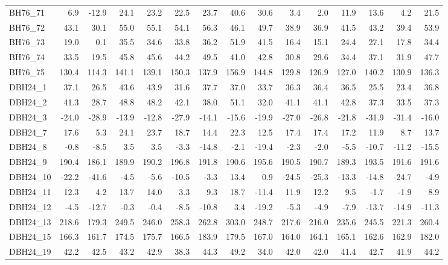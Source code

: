 \begin{longtable}{lrrrrrrrrrrrrrr}
BH76\_71 & 6.9 & -12.9 & 24.1 & 23.2 & 22.5 & 23.7 & 40.6 & 30.6 & 3.4 & 2.0 & 11.9 & 13.6 & 4.2 & 21.5 \\
BH76\_72 & 43.1 & 30.1 & 55.0 & 55.1 & 54.1 & 56.3 & 46.1 & 49.7 & 38.9 & 36.9 & 41.5 & 43.2 & 39.4 & 53.9 \\
BH76\_73 & 19.0 & 0.1 & 35.5 & 34.6 & 33.8 & 36.2 & 51.9 & 41.5 & 16.4 & 15.1 & 24.4 & 27.1 & 17.8 & 34.4 \\
BH76\_74 & 33.5 & 19.5 & 45.8 & 45.6 & 44.2 & 49.5 & 41.0 & 42.8 & 30.8 & 29.6 & 34.4 & 37.1 & 31.9 & 47.7 \\
BH76\_75 & 130.4 & 114.3 & 141.1 & 139.1 & 150.3 & 137.9 & 156.9 & 144.8 & 129.8 & 126.9 & 127.0 & 140.2 & 130.9 & 136.3 \\
DBH24\_1 & 37.1 & 26.5 & 43.6 & 43.9 & 31.6 & 37.7 & 37.0 & 33.7 & 36.3 & 36.4 & 36.5 & 25.5 & 23.4 & 36.8 \\
DBH24\_2 & 41.3 & 28.7 & 48.8 & 48.2 & 42.1 & 38.0 & 51.1 & 32.0 & 41.1 & 41.1 & 42.8 & 37.3 & 33.5 & 37.3 \\
DBH24\_3 & -24.0 & -28.9 & -13.9 & -12.8 & -27.9 & -14.1 & -15.6 & -19.9 & -27.0 & -26.8 & -21.8 & -31.9 & -31.4 & -16.0 \\
DBH24\_7 & 17.6 & 5.3 & 24.1 & 23.7 & 18.7 & 14.4 & 22.3 & 12.5 & 17.4 & 17.4 & 17.2 & 11.9 & 8.7 & 13.7 \\
DBH24\_8 & -0.8 & -8.5 & 3.5 & 3.5 & -3.3 & -14.8 & -2.1 & -19.4 & -2.3 & -2.0 & -5.5 & -10.7 & -11.2 & -15.5 \\
DBH24\_9 & 190.4 & 186.1 & 189.9 & 190.2 & 196.8 & 191.8 & 190.6 & 195.6 & 190.5 & 190.7 & 189.3 & 193.5 & 191.6 & 191.6 \\
DBH24\_10 & -22.2 & -41.6 & -4.5 & -5.6 & -10.5 & -3.3 & 13.4 & 0.9 & -24.5 & -25.3 & -13.3 & -14.8 & -24.7 & -4.9 \\
DBH24\_11 & 12.3 & 4.2 & 13.7 & 14.0 & 3.3 & 9.3 & 18.7 & -11.4 & 11.9 & 12.2 & 9.5 & -1.7 & -1.9 & 8.9 \\
DBH24\_12 & -4.5 & -12.7 & -0.3 & -0.4 & -8.5 & -10.8 & 3.4 & -19.2 & -5.3 & -4.9 & -7.9 & -13.7 & -14.9 & -11.3 \\
DBH24\_13 & 218.6 & 179.3 & 249.5 & 246.0 & 258.3 & 262.8 & 303.0 & 248.7 & 217.6 & 216.0 & 235.6 & 245.5 & 221.3 & 260.4 \\
DBH24\_15 & 166.3 & 161.7 & 174.5 & 175.7 & 166.5 & 183.9 & 179.5 & 167.0 & 164.0 & 164.1 & 165.1 & 162.6 & 162.9 & 182.0 \\
DBH24\_19 & 42.2 & 42.5 & 43.2 & 42.9 & 38.3 & 44.3 & 49.2 & 34.0 & 42.0 & 42.0 & 41.4 & 42.7 & 41.9 & 44.2 \\

\end{longtable}
